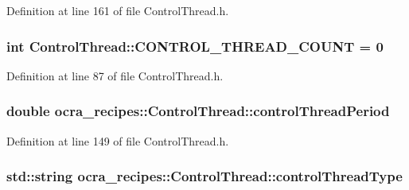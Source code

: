 Definition at line 161 of file Control\+Thread.\+h.

\subsubsection[{\texorpdfstring{C\+O\+N\+T\+R\+O\+L\+\_\+\+T\+H\+R\+E\+A\+D\+\_\+\+C\+O\+U\+NT}{CONTROL_THREAD_COUNT}}]{\setlength{\rightskip}{0pt plus 5cm}int Control\+Thread\+::\+C\+O\+N\+T\+R\+O\+L\+\_\+\+T\+H\+R\+E\+A\+D\+\_\+\+C\+O\+U\+NT = 0\hspace{0.3cm}{\ttfamily [static]}}\hypertarget{classocra__recipes_1_1ControlThread_af77b19fbb04fcf73374045928d3fef12}{}\label{classocra__recipes_1_1ControlThread_af77b19fbb04fcf73374045928d3fef12}


Definition at line 87 of file Control\+Thread.\+h.

\subsubsection[{\texorpdfstring{control\+Thread\+Period}{controlThreadPeriod}}]{\setlength{\rightskip}{0pt plus 5cm}double ocra\+\_\+recipes\+::\+Control\+Thread\+::control\+Thread\+Period\hspace{0.3cm}{\ttfamily [protected]}}\hypertarget{classocra__recipes_1_1ControlThread_affbc4af946e3c2eabd2ce1cf30376bf2}{}\label{classocra__recipes_1_1ControlThread_affbc4af946e3c2eabd2ce1cf30376bf2}


Definition at line 149 of file Control\+Thread.\+h.

\subsubsection[{\texorpdfstring{control\+Thread\+Type}{controlThreadType}}]{\setlength{\rightskip}{0pt plus 5cm}std\+::string ocra\+\_\+recipes\+::\+Control\+Thread\+::control\+Thread\+Type\hspace{0.3cm}{\ttfamily [protected]}}\hypertarget{classocra__recipes_1_1ControlThread_aa8c8f3c06e3e2f22a0d46814f067ec79}{}\label{classocra__recipes_1_1ControlThread_aa8c8f3c06e3e2f22a0d46814f067ec79}


